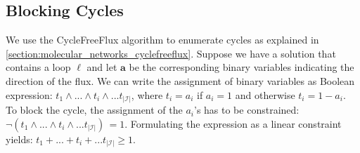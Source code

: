 \subsection{Blocking Cycles} \label{section:blocking_cycles}
We use the \textsf{CycleFreeFlux} algorithm to enumerate cycles as explained in \cref{section:molecular_networks_cyclefreeflux}.
Suppose we have a solution that contains a loop $\boldsymbol \ell$ %
and let $\boldsymbol a$ be the corresponding binary variables indicating the direction of the flux. We can write the assignment of binary variables as Boolean expression: $t_1 \land ... \land t_i \land ... t_{|\mathcal{I}|}$, where $t_i = a_i$ if $a_i=1$ and otherwise $t_i = 1 -a_i$.
To block the cycle, the assignment of the $a_i$'s has to be constrained: 
    $\neg (t_1 \land ... \land t_i \land ... t_{|\mathcal{I}|}) \, = 1$.
Formulating the expression as a linear constraint yields:
    $t_1 + ... + t_i + ... t_{|\mathcal{I}|} \geq 1$.

